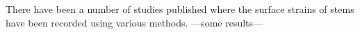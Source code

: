 There have been a number of studies published where the surface strains of stems have been recorded using various methods. ---some results---